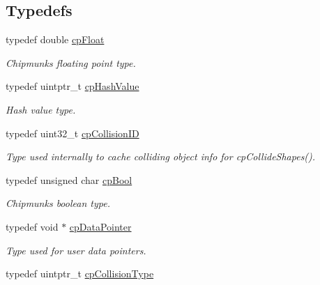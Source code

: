 \subsection*{Typedefs}
\begin{DoxyCompactItemize}
\item 
typedef double \hyperlink{group__basic_types_gac1ed65573e035bf892505768c852d8d3}{cp\+Float}
\begin{DoxyCompactList}\small\item\em Chipmunk\textquotesingle{}s floating point type. \end{DoxyCompactList}\item 
\hypertarget{group__basic_types_gae7eb4775a9f43914a15553ca65a048f4}{}typedef uintptr\+\_\+t \hyperlink{group__basic_types_gae7eb4775a9f43914a15553ca65a048f4}{cp\+Hash\+Value}\label{group__basic_types_gae7eb4775a9f43914a15553ca65a048f4}

\begin{DoxyCompactList}\small\item\em Hash value type. \end{DoxyCompactList}\item 
typedef uint32\+\_\+t \hyperlink{group__basic_types_ga89d4043ca0567e947aaca19cf9600df5}{cp\+Collision\+I\+D}
\begin{DoxyCompactList}\small\item\em Type used internally to cache colliding object info for cp\+Collide\+Shapes(). \end{DoxyCompactList}\item 
\hypertarget{group__basic_types_gabc5e752c48f3449ca26ef413ecbd647e}{}typedef unsigned char \hyperlink{group__basic_types_gabc5e752c48f3449ca26ef413ecbd647e}{cp\+Bool}\label{group__basic_types_gabc5e752c48f3449ca26ef413ecbd647e}

\begin{DoxyCompactList}\small\item\em Chipmunk\textquotesingle{}s boolean type. \end{DoxyCompactList}\item 
\hypertarget{group__basic_types_ga2ac2c3c31e21893941f9e4f8ee279447}{}typedef void $\ast$ \hyperlink{group__basic_types_ga2ac2c3c31e21893941f9e4f8ee279447}{cp\+Data\+Pointer}\label{group__basic_types_ga2ac2c3c31e21893941f9e4f8ee279447}

\begin{DoxyCompactList}\small\item\em Type used for user data pointers. \end{DoxyCompactList}\item 
\hypertarget{group__basic_types_gae83e2f50965eb441e36ffff1e32e6d02}{}typedef uintptr\+\_\+t \hyperlink{group__basic_types_gae83e2f50965eb441e36ffff1e32e6d02}{cp\+Collision\+Type}\label{group__basic_types_gae83e2f50965eb441e36ffff1e32e6d02}


\end{DoxyCompactItemize}
